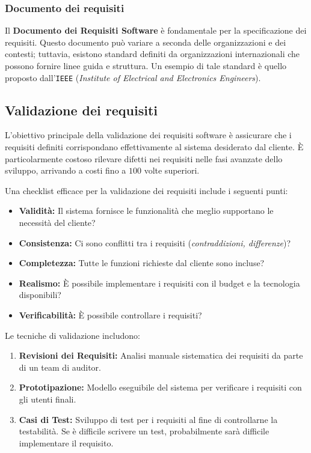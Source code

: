 \subsubsection{Documento dei requisiti}
Il \textbf{Documento dei Requisiti Software} è fondamentale per la specificazione
dei requisiti. Questo documento può variare a seconda delle organizzazioni e dei
contesti; tuttavia, esistono standard definiti da organizzazioni internazionali
che possono fornire linee guida e struttura. Un esempio di tale standard è quello
proposto dall'\texttt{IEEE} (\textit{Institute of Electrical and Electronics Engineers}).
\subsection{Validazione dei requisiti}
L'obiettivo principale della validazione dei requisiti software è assicurare
che i requisiti definiti corrispondano effettivamente al sistema desiderato dal
cliente. È particolarmente costoso rilevare difetti nei requisiti nelle fasi avanzate
dello sviluppo, arrivando a costi fino a $100$ volte superiori.

Una checklist efficace per la validazione dei requisiti include i seguenti punti:
\begin{itemize}
    \item \textbf{Validità:} Il sistema fornisce le funzionalità che meglio supportano
    le necessità del cliente?
    \item \textbf{Consistenza:} Ci sono conflitti tra i requisiti (\textit{contraddizioni,
    differenze})?
    \item \textbf{Completezza:} Tutte le funzioni richieste dal cliente sono incluse?
    \item \textbf{Realismo:} È possibile implementare i requisiti con il budget e la
    tecnologia disponibili?
    \item \textbf{Verificabilità:} È possibile controllare i requisiti?
\end{itemize}
Le tecniche di validazione includono:

\begin{enumerate}
    \item \textbf{Revisioni dei Requisiti:} Analisi manuale sistematica dei
    requisiti da parte di un team di auditor.
    \item \textbf{Prototipazione:} Modello eseguibile del sistema per verificare
    i requisiti con gli utenti finali.
    \item \textbf{Casi di Test:} Sviluppo di test per i requisiti al fine di
    controllarne la testabilità. Se è difficile scrivere un test, probabilmente
    sarà difficile implementare il requisito.
\end{enumerate}
